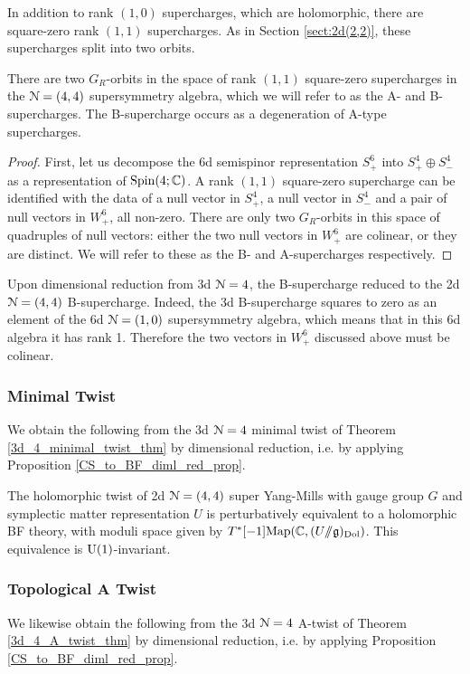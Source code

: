 \documentclass[10pt, oneside]{article}
\newcommand{\ham}{/\!\!/}
\begin{document}
In addition to rank $(1,0)$ supercharges, which are holomorphic, there are square-zero rank $(1,1)$ supercharges.  As in Section \ref{sect:2d(2,2)}, these supercharges split into two orbits.

\begin{prop}
There are two $G_R$-orbits in the space of rank $(1,1)$ square-zero supercharges in the $\mathcal{N}=(4,4)$ supersymmetry algebra, which we will refer to as the A- and B-supercharges.  The B-supercharge occurs as a degeneration of A-type supercharges.
\end{prop}

\begin{proof}
First, let us decompose the 6d semispinor representation $S_+^6$ into $S_+^4 \oplus S_-^4$ as a representation of $\mathrm{Spin}(4;\mathbb C)$. A rank $(1,1)$ square-zero supercharge can be identified with the data of a null vector in $S_+^4$, a null vector in $S_-^4$ and a pair of null vectors in $W_+^6$, all non-zero.  There are only two $G_R$-orbits in this space of quadruples of null vectors: either the two null vectors in $W_+^6$ are colinear, or they are distinct.  We will refer to these as the B- and A-supercharges respectively.
\end{proof}

Upon dimensional reduction from 3d $\mathcal{N}=4$, the B-supercharge reduced to the 2d $\mathcal{N}=(4,4)$ B-supercharge.  Indeed, the 3d B-supercharge squares to zero as an element of the 6d $\mathcal{N}=(1,0)$ supersymmetry algebra, which means that in this 6d algebra it has rank 1.  Therefore the two vectors in $W_+^6$ discussed above must be colinear. 

\subsubsection{Minimal Twist} \label{sect:2d44minimaltwist}
We obtain the following from the 3d $\mathcal{N}=4$ minimal twist of Theorem \ref{3d_4_minimal_twist_thm} by dimensional reduction, i.e. by applying Proposition \ref{CS_to_BF_diml_red_prop}.

\begin{theorem}
The holomorphic twist of 2d $\mathcal{N}=(4,4)$ super Yang-Mills with gauge group $G$ and symplectic matter representation $U$ is perturbatively equivalent to a holomorphic BF theory, with moduli space given by $T^*[-1]\mr{Map}(\CC, (U \ham \gg)_{\mr{Dol}})$. This equivalence is $\mathrm{U}(1)$-invariant.
\end{theorem}

\subsubsection{Topological A Twist} \label{sect:2d44Atwist}
We likewise obtain the following from the 3d $\mathcal{N}=4$ A-twist of Theorem \ref{3d_4_A_twist_thm} by dimensional reduction, i.e. by applying Proposition \ref{CS_to_BF_diml_red_prop}.
\end{document}
